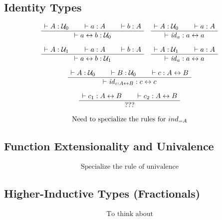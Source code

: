 \documentclass[format=acmlarge,review,natbib]{acmart}
\newcommand{\idc}{\mathit{id}}
\newcommand{\iso}{\leftrightarrow}
\newcommand{\uzero}{\mathcal{U}_0}
\newcommand{\uone}{\mathcal{U}_1}
\newcommand{\proves}{\vdash}
\newcommand{\jdg}[2]{\proves #1 : #2}
\begin{document}
\subsection{Identity Types}

\[
  \begin{array}{c}
    \AxiomC{$\jdg{A}{\uzero}$}
    \AxiomC{$\jdg{a}{A}$}
    \AxiomC{$\jdg{b}{A}$}
    \TrinaryInfC{$\jdg{a \iso b}{\uzero}$}
    \DisplayProof
    \quad
    \AxiomC{$\jdg{A}{\uzero}$}
    \AxiomC{$\jdg{a}{A}$}
    \BinaryInfC{$\jdg{\idc_{a}}{a \iso a}$}
    \DisplayProof
    \\
    \\
    \AxiomC{$\jdg{A}{\uone}$}
    \AxiomC{$\jdg{a}{A}$}
    \AxiomC{$\jdg{b}{A}$}
    \TrinaryInfC{$\jdg{a \iso b}{\uone}$}
    \DisplayProof
    \quad
    \AxiomC{$\jdg{A}{\uone}$}
    \AxiomC{$\jdg{a}{A}$}
    \BinaryInfC{$\jdg{\idc_{a}}{a \iso a}$}
    \DisplayProof
    \\
    \\
    \AxiomC{$\jdg{A}{\uzero}$}
    \AxiomC{$\jdg{B}{\uzero}$}
    \AxiomC{$\jdg{c}{A \iso B}$}
    \TrinaryInfC{$\jdg{\idc_{c:A\iso B}}{c \iso c}$}
    \DisplayProof
    \\
    \\
    \AxiomC{$\jdg{c_1}{A \iso B}$}
    \AxiomC{$\jdg{c_2}{A \iso B}$}
    \BinaryInfC{$???$}
    \DisplayProof
    \\
    \\
    \mbox{Need to specialize the rules for } ind_{=A}
  \end{array}
\]

\subsection{Function Extensionality and Univalence}

\[
  \begin{array}{c}
    \mbox{Specialize the rule of univalence}
  \end{array}
\]

\subsection{Higher-Inductive Types (Fractionals)}

\[
  \begin{array}{c}
    \mbox{To think about}
  \end{array}
\]


{\footnotesize

}
\end{document}
